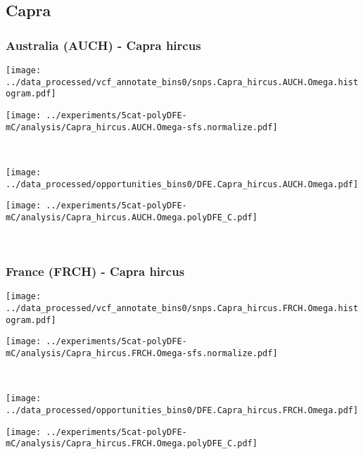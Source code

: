 \subsection{Capra}

\subsubsection{Australia (AUCH) - Capra hircus}

\begin{minipage}{0.49\linewidth}
    \texttt{[image: ../data\_processed/vcf\_annotate\_bins0/snps.Capra\_hircus.AUCH.Omega.histogram.pdf]}
\end{minipage}
\begin{minipage}{0.49\linewidth}
    \texttt{[image: ../experiments/5cat-polyDFE-mC/analysis/Capra\_hircus.AUCH.Omega-sfs.normalize.pdf]}
\end{minipage}
\\
\begin{minipage}{0.49\linewidth}
    \texttt{[image: ../data\_processed/opportunities\_bins0/DFE.Capra\_hircus.AUCH.Omega.pdf]}
\end{minipage}
\begin{minipage}{0.49\linewidth}
    \texttt{[image: ../experiments/5cat-polyDFE-mC/analysis/Capra\_hircus.AUCH.Omega.polyDFE\_C.pdf]}
\end{minipage}
\\

\subsubsection{France (FRCH) - Capra hircus}

\begin{minipage}{0.49\linewidth}
    \texttt{[image: ../data\_processed/vcf\_annotate\_bins0/snps.Capra\_hircus.FRCH.Omega.histogram.pdf]}
\end{minipage}
\begin{minipage}{0.49\linewidth}
    \texttt{[image: ../experiments/5cat-polyDFE-mC/analysis/Capra\_hircus.FRCH.Omega-sfs.normalize.pdf]}
\end{minipage}
\\
\begin{minipage}{0.49\linewidth}
    \texttt{[image: ../data\_processed/opportunities\_bins0/DFE.Capra\_hircus.FRCH.Omega.pdf]}
\end{minipage}
\begin{minipage}{0.49\linewidth}
    \texttt{[image: ../experiments/5cat-polyDFE-mC/analysis/Capra\_hircus.FRCH.Omega.polyDFE\_C.pdf]}
\end{minipage}
\\

